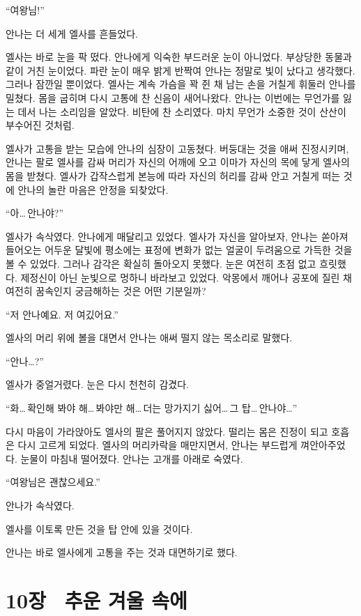 ``여왕님!''

안나는 더 세게 엘사를 흔들었다.

엘사는 바로 눈을 팍 떴다. 안나에게 익숙한 부드러운 눈이 아니었다. 부상당한 동물과 같이 거친 눈이었다. 파란 눈이 매우 밝게 반짝여 안나는 정말로 빛이 났다고 생각했다. 그러나 잠깐일 뿐이었다. 엘사는 계속 가슴을 꽉 쥔 채 남는 손을 거칠게 휘둘러 안나를 밀쳤다. 몸을 굽히며 다시 고통에 찬 신음이 새어나왔다. 안나는 이번에는 무언가를 잃는 데서 나는 소리임을 알았다. 비탄에 찬 소리였다. 마치 무언가 소중한 것이 산산이 부수어진 것처럼.

엘사가 고통을 받는 모습에 안나의 심장이 고동쳤다. 버둥대는 것을 애써 진정시키며, 안나는 팔로 엘사를 감싸 머리가 자신의 어깨에 오고 이마가 자신의 목에 닿게 엘사의 몸을 받쳤다. 엘사가 갑작스럽게 본능에 따라 자신의 허리를 감싸 안고 거칠게 떠는 것에 안나의 놀란 마음은 안정을 되찾았다.

``아\ldots\,안나야?''

엘사가 속삭였다. 안나에게 매달리고 있었다. 엘사가 자신을 알아보자, 안나는 쏟아져 들어오는 어두운 달빛에 평소에는 표정에 변화가 없는 얼굴이 두려움으로 가득한 것을 볼 수 있었다. 그러나 감각은 확실히 돌아오지 못했다. 눈은 여전히 초점 없고 흐릿했다. 제정신이 아닌 눈빛으로 멍하니 바라보고 있었다. 악몽에서 깨어나 공포에 질린 채 여전히 꿈속인지 궁금해하는 것은 어떤 기분일까?

``저 안나예요. 저 여깄어요.''

엘사의 머리 위에 볼을 대면서 안나는 애써 떨지 않는 목소리로 말했다.

``안나\ldots?''

엘사가 중얼거렸다. 눈은 다시 천천히 감겼다.

``화\ldots\,확인해 봐야 해\ldots\,봐야만 해\ldots\,더는 망가지기 싫어\ldots\,그 탑\ldots\,안나야\ldots''

다시 마음이 가라앉아도 엘사의 팔은 풀어지지 않았다. 떨리는 몸은 진정이 되고 호흡은 다시 고르게 되었다. 엘사의 머리카락을 매만지면서, 안나는 부드럽게 껴안아주었다. 눈물이 마침내 떨어졌다. 안나는 고개를 아래로 숙였다.

``여왕님은 괜찮으세요.''

안나가 속삭였다.

엘사를 이토록 만든 것을 탑 안에 있을 것이다.

안나는 바로 엘사에게 고통을 주는 것과 대면하기로 했다.



\chapter[10장  추운 겨울 속에][10장\hspace*{.5em}추운 겨울 속에]{10장 \ 추운 겨울 속에}



